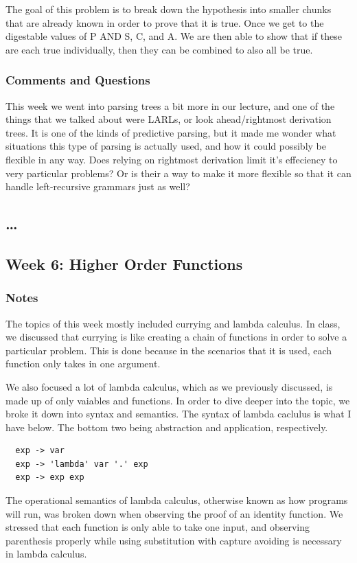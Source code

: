 \documentclass{article}
\theoremstyle{theorem}
\theoremstyle{definition}
\theoremstyle{remark}
\begin{document}
The goal of this problem is to break down the hypothesis into smaller chunks that are
already known in order to prove that it is true. Once we get to the digestable values
of P AND S, C, and A. We are then able to show that if these are each true individually,
then they can be combined to also all be true.

\subsubsection*{Comments and Questions}
This week we went into parsing trees a bit more in our lecture, and one of the 
things that we talked about were LARLs, or look ahead/rightmost derivation trees.
It is one of the kinds of predictive parsing, but it made me wonder what situations
this type of parsing is actually used, and how it could possibly be flexible in any way. 
Does relying on rightmost derivation limit it's effeciency to very particular problems?
Or is their a way to make it more flexible so that it can handle left-recursive 
grammars just as well?

\subsection{\ldots}

\subsection{Week 6: Higher Order Functions}
\subsubsection*{Notes}
The topics of this week mostly included currying and lambda calculus. In class, we discussed that currying is like
creating a chain of functions in order to solve a particular problem. This is done because in the scenarios 
that it is used, each function only takes in one argument. 

We also focused a lot of lambda calculus, which as we previously discussed, is made up of only vaiables 
and functions. In order to dive deeper into the topic, we broke it down into syntax and semantics. 
The syntax of lambda caclulus is what I have below. The bottom two being abstraction and application, respectively.
\begin{lstlisting}
  exp -> var
  exp -> 'lambda' var '.' exp
  exp -> exp exp 
\end{lstlisting}

The operational semantics of lambda calculus, otherwise known as how programs will run, was broken down 
when observing the proof of an identity function. We stressed that each function is only able to take
one input, and observing parenthesis properly while using substitution with capture avoiding is necessary
in lambda calculus.
\end{document}
